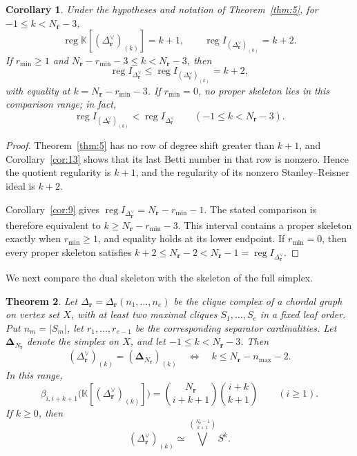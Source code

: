 \documentclass[11pt]{amsart}
\newtheorem{theorem}{Theorem}[section]
\newtheorem{corollary}[theorem]{Corollary}
\theoremstyle{definition}
\theoremstyle{remark}
\newcommand{\K}{\mathbb K}
\newcommand{\SR}[1]{\K[#1]}
\DeclareMathOperator{\reg}{reg}
\begin{document}
	\begin{corollary}\label{cor:15}
		Under the hypotheses and notation of Theorem~\ref{thm:5}, for $-1\le k<N_{\mathbf r}-3$,
		\[
		\reg\SR{(\Delta_{\mathbf r}^\vee)_{(k)}}=k+1,
		\qquad
		\reg I_{(\Delta_{\mathbf r}^\vee)_{(k)}}=k+2.
		\]
		If $r_{\min}\ge1$ and $N_{\mathbf r}-r_{\min}-3\le k<N_{\mathbf r}-3$, then
		\[
		\reg I_{\Delta_{\mathbf r}^\vee}
		\le
		\reg I_{(\Delta_{\mathbf r}^\vee)_{(k)}}=k+2,
		\]
		with equality at $k=N_{\mathbf r}-r_{\min}-3$. If $r_{\min}=0$, no proper skeleton lies in this comparison range; in fact,
		\[
		\reg I_{(\Delta_{\mathbf r}^\vee)_{(k)}}
		<
		\reg I_{\Delta_{\mathbf r}^\vee}
		\qquad(-1\le k<N_{\mathbf r}-3).
		\]
	\end{corollary}
	
	\begin{proof}
		Theorem~\ref{thm:5} has no row of degree shift greater than $k+1$, and Corollary~\ref{cor:13} shows that its last Betti number in that row is nonzero. Hence the quotient regularity is $k+1$, and the regularity of its nonzero Stanley--Reisner ideal is $k+2$.
		
		Corollary~\ref{cor:9} gives $\reg I_{\Delta_{\mathbf r}^\vee}=N_{\mathbf r}-r_{\min}-1$. The stated comparison is therefore equivalent to $k\ge N_{\mathbf r}-r_{\min}-3$. This interval contains a proper skeleton exactly when $r_{\min}\ge1$, and equality holds at its lower endpoint. If $r_{\min}=0$, then every proper skeleton satisfies $k+2\le N_{\mathbf r}-2<N_{\mathbf r}-1=\reg I_{\Delta_{\mathbf r}^\vee}$.
	\end{proof}
	
	We next compare the dual skeleton with the skeleton of the full simplex.
	
	\begin{theorem}\label{thm:6}
		Let $\Delta_{\mathbf r}=\Delta_{\mathbf r}(n_1,\ldots,n_e)$ be the clique complex of a chordal graph on vertex set $X$, with at least two maximal cliques $S_1,\ldots,S_e$ in a fixed leaf order. Put $n_m=|S_m|$, let $r_1,\ldots,r_{e-1}$ be the corresponding separator cardinalities.
		Let $\boldsymbol\Delta_{N_{\mathbf r}}$ denote the simplex on $X$, and let $-1\le k<N_{\mathbf r}-3$. Then
		\[
		(\Delta_{\mathbf r}^\vee)_{(k)}
		=(\boldsymbol\Delta_{N_{\mathbf r}})_{(k)}
		\quad\Longleftrightarrow\quad
		k\le N_{\mathbf r}-n_{\max}-2.
		\]
		In this range,
		\[
		\beta_{i,i+k+1}\bigl(\SR{(\Delta_{\mathbf r}^\vee)_{(k)}}\bigr)
		=
		\binom{N_{\mathbf r}}{i+k+1}\binom{i+k}{k+1}
		\qquad(i\ge1).
		\]
		If $k\ge0$, then
		\[
		(\Delta_{\mathbf r}^\vee)_{(k)}
		\simeq
		\bigvee^{\binom{N_{\mathbf r}-1}{k+1}}S^k.
		\]
	\end{theorem}
	
\end{document}
